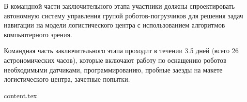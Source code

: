 \documentclass[a4paper,12pt,oneside]{book}
\begin{document}
В командной части заключительного этапа участники должны
спроектировать автономную систему управления групой роботов-погрузчиков
для решения задач навигации на модели логистического центра с
использованием алгоритмов компьютерного зрения.

Командная часть заключительного этапа проходит в течении
3.5 дней (всего 26 астрономических часов), которые включают работу по
оснащению роботов необходимыми датчиками, программированию, пробные заезды
на макете логистического центра, зачетные попытки.

{content.tex}


\end{document}
